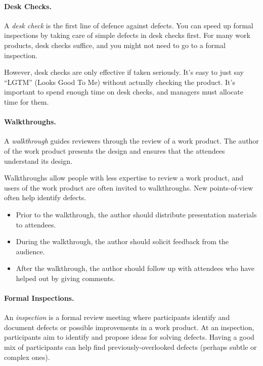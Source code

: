\paragraph{Desk Checks.}
A \emph{desk check} is the first line of defence against defects.  You
can speed up formal inspections by taking care of simple defects in
desk checks first. For many work products, desk checks suffice, and you
might not need to go to a formal inspection.

However, desk checks are only effective if taken seriously. It's easy
to just say ``LGTM'' (Looks Good To Me) without actually checking the
product. It's important to spend enough time on desk checks, and
managers must allocate time for them. 

\paragraph{Walkthroughs.}

A \emph{walkthrough} guides reviewers through the review of a work
product.  The author of the work product presents the design and
ensures that the attendees understand its design.

Walkthroughs allow people with less expertise to review a work
product, and users of the work product are often invited to
walkthroughs.  New points-of-view often help identify defects.

\begin{itemize}
\item Prior to the walkthrough, the author should distribute presentation materials to attendees.
\item During the walkthrough, the author should solicit feedback from the audience.
\item After the walkthrough, the author should follow up with attendees who have helped out by giving comments.
\end{itemize}

\paragraph{Formal Inspections.}

An \emph{inspection} is a formal review meeting where participants
identify and document defects or possible improvements in a work
product. At an inspection, participants aim to identify and propose
ideas for solving defects. Having a good mix of participants can help
find previously-overlooked defects (perhaps subtle or complex ones).

